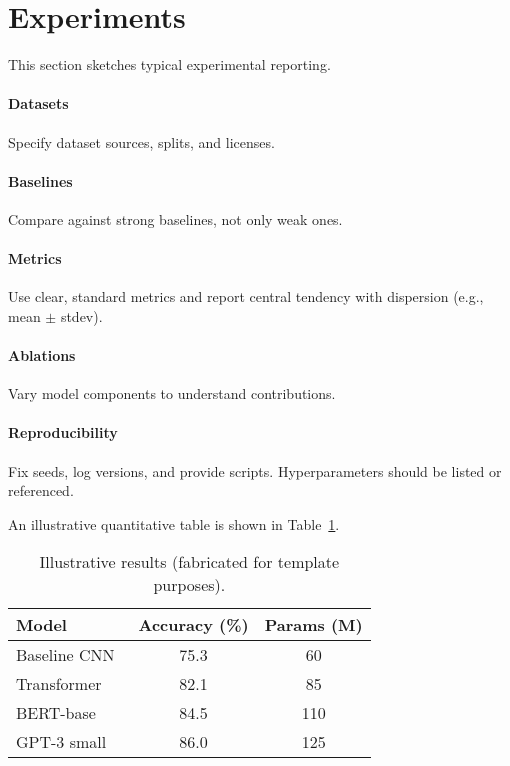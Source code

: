 \section{Experiments}
This section sketches typical experimental reporting.

\paragraph{Datasets} Specify dataset sources, splits, and licenses.

\paragraph{Baselines} Compare against strong baselines, not only weak ones.

\paragraph{Metrics} Use clear, standard metrics and report central tendency with dispersion (e.g., mean $\pm$ stdev).

\paragraph{Ablations} Vary model components to understand contributions.

\paragraph{Reproducibility} Fix seeds, log versions, and provide scripts. Hyperparameters should be listed or referenced.

An illustrative quantitative table is shown in Table~\ref{tab:results}.

\begin{table}[h]
  \centering
  \begin{tabular}{lcc}
    \toprule
    Model & Accuracy (\%) & Params (M) \\
    \midrule
    Baseline CNN~\citep{krizhevsky2012imagenet} & 75.3 & 60 \\
    Transformer~\citep{vaswani2017attention} & 82.1 & 85 \\
    BERT-base~\citep{devlin2018bert} & 84.5 & 110 \\
    GPT-3 small~\citep{brown2020language} & 86.0 & 125 \\
    \bottomrule
  \end{tabular}
  \caption{Illustrative results (fabricated for template purposes).}
  \label{tab:results}
\end{table}
